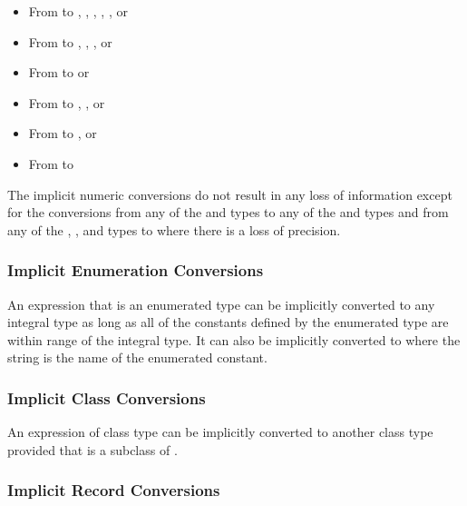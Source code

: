 \begin{itemize}
\item From  to , , , , , or 
\item From  to , , , or 
\item From  to  or 
\item From  to , , or 
\item From  to , or 
\item From  to 
\end{itemize}

The implicit numeric conversions do not result in any loss of
information except for the conversions from any of the 
and  types to any of the  and 
types and from any of the , , and 
types to  where there is a loss of precision.

\subsubsection{Implicit Enumeration Conversions}
\label{Implicit_Enumeration_Conversions}

An expression that is an enumerated type can be implicitly converted
to any integral type as long as all of the constants defined by the
enumerated type are within range of the integral type.  It can also be
implicitly converted to  where the string is the name of
the enumerated constant.

\subsubsection{Implicit Class Conversions}
\label{Implicit_Class_Conversions}

An expression of class type  can be implicitly converted to
another class type  provided that  is a subclass
of .

\subsubsection{Implicit Record Conversions}
\label{Implicit_Record_Conversions}

